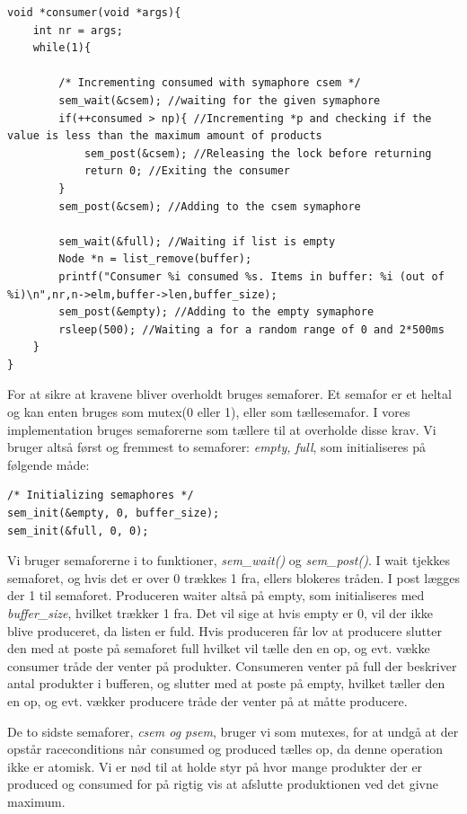 \documentclass[danish]{report}
\begin{document}
\begin{lstlisting}    
void *consumer(void *args){
	int nr = args;
	while(1){
	
		/* Incrementing consumed with symaphore csem */
		sem_wait(&csem); //waiting for the given symaphore
		if(++consumed > np){ //Incrementing *p and checking if the value is less than the maximum amount of products
			sem_post(&csem); //Releasing the lock before returning
			return 0; //Exiting the consumer
		}
		sem_post(&csem); //Adding to the csem symaphore
		
		sem_wait(&full); //Waiting if list is empty
		Node *n = list_remove(buffer);
		printf("Consumer %i consumed %s. Items in buffer: %i (out of %i)\n",nr,n->elm,buffer->len,buffer_size);
		sem_post(&empty); //Adding to the empty symaphore
		rsleep(500); //Waiting a for a random range of 0 and 2*500ms
	}
}
\end{lstlisting}

For at sikre at kravene bliver overholdt bruges semaforer. Et semafor er et heltal og kan enten bruges som mutex(0 eller 1), eller som tællesemafor. I vores implementation bruges semaforerne som tællere til at overholde disse krav. Vi bruger altså først og fremmest to semaforer: \textit{empty, full}, som initialiseres på følgende måde:

\begin{lstlisting}    
/* Initializing semaphores */
sem_init(&empty, 0, buffer_size);
sem_init(&full, 0, 0);
\end{lstlisting}

Vi bruger semaforerne i to funktioner, \textit{sem\_wait()} og \textit{sem\_post()}. I wait tjekkes semaforet, og hvis det er over 0 trækkes 1 fra, ellers blokeres tråden. I post lægges der 1 til semaforet. Produceren waiter altså på empty, som initialiseres med \textit{buffer\_size}, hvilket trækker 1 fra. Det vil sige at hvis empty er 0, vil der ikke blive produceret, da listen er fuld. Hvis produceren får lov at producere slutter den med at poste på semaforet full hvilket vil tælle den en op, og evt. vække consumer tråde der venter på produkter. Consumeren venter på full der beskriver antal produkter i bufferen, og slutter med at poste på empty, hvilket tæller den en op, og evt. vækker producere tråde der venter på at måtte producere.

De to sidste semaforer, \textit{csem og psem}, bruger vi som mutexes, for at undgå at der opstår raceconditions når consumed og produced tælles op, da denne operation ikke er atomisk. Vi er nød til at holde styr på hvor mange produkter der er produced og consumed for på rigtig vis at afslutte produktionen ved det givne maximum.
\end{document}

